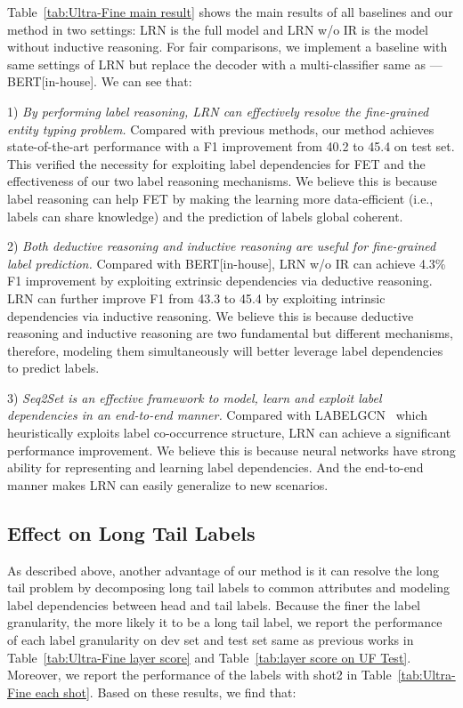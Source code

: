 \documentclass[11pt]{article}
\begin{document}
Table~\ref{tab:Ultra-Fine main result} shows the main results of all baselines and our method in two settings: LRN is the full model and LRN \small w/o IR \normalsize is the model without inductive reasoning. For fair comparisons, we implement a baseline with same settings of LRN but replace the decoder with a multi-classifier same as \citet{choi2018ultra_data1} --- BERT[in-house]. We can see that:

1) \textit{By performing label reasoning, LRN can effectively resolve the fine-grained entity typing problem.} Compared with previous methods, our method achieves state-of-the-art performance with a F1 improvement from 40.2 to 45.4 on test set. This verified the necessity for exploiting label dependencies for FET and the effectiveness of our two label reasoning mechanisms. We believe this is because label reasoning can help FET by making the learning more data-efficient (i.e., labels can share knowledge) and the prediction of labels global coherent.

2) \textit{Both deductive reasoning and inductive reasoning are useful for fine-grained label prediction.} Compared with BERT[in-house], LRN \small w/o IR \normalsize can achieve 4.3\% F1 improvement by exploiting extrinsic dependencies via deductive reasoning. LRN can further improve F1 from 43.3 to 45.4 by exploiting intrinsic dependencies via inductive reasoning. We believe this is because deductive reasoning and inductive reasoning are two fundamental but different mechanisms, therefore, modeling them simultaneously will better leverage label dependencies to predict labels.

3) \textit{Seq2Set is an effective framework to model, learn and exploit label dependencies in an end-to-end manner.} Compared with L\small{ABEL}\normalsize{GCN}~\citep{xiong2019imposing_core2} which heuristically exploits label co-occurrence structure, LRN can achieve a significant performance improvement. We believe this is because neural networks have strong ability for representing and learning label dependencies. And the end-to-end manner makes LRN can easily generalize to new scenarios.

\subsection{Effect on Long Tail Labels}
As described above, another advantage of our method is it can resolve the long tail problem by decomposing long tail labels to common attributes and modeling label dependencies between head and tail labels. Because the finer the label granularity, the more likely it to be a long tail label, we report the performance of each label granularity on dev set and test set same as previous works in Table~\ref{tab:Ultra-Fine layer score} and Table~\ref{tab:layer score on UF Test}. Moreover, we report the performance of the labels with shot2 in Table~\ref{tab:Ultra-Fine each shot}. Based on these results, we find that:
\end{document}
